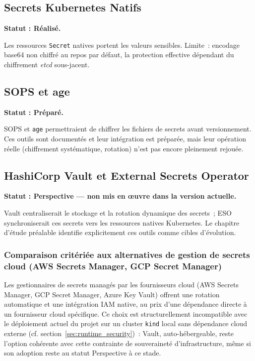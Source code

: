 \subsection{Secrets Kubernetes Natifs}
\textbf{Statut : Réalisé.}

Les ressources \texttt{Secret} natives portent les valeurs sensibles. Limite~: encodage base64 non chiffré au repos par défaut, la protection effective dépendant du chiffrement \textit{etcd} sous-jacent.

\subsection{SOPS et age}
\textbf{Statut : Préparé.}

SOPS et \texttt{age} permettraient de chiffrer les fichiers de secrets avant versionnement. Ces outils sont documentés et leur intégration est préparée, mais leur opération réelle (chiffrement systématique, rotation) n'est pas encore pleinement rejouée.

\subsection{HashiCorp Vault et External Secrets Operator}
\textbf{Statut : Perspective — non mis en œuvre dans la version actuelle.}

Vault centraliserait le stockage et la rotation dynamique des secrets~; ESO synchroniserait ces secrets vers les ressources natives Kubernetes. Le chapitre d'étude préalable identifie explicitement ces outils comme cibles d'évolution.

\subsubsection{Comparaison critériée aux alternatives de gestion de secrets cloud (AWS Secrets Manager, GCP Secret Manager)}
Les gestionnaires de secrets managés par les fournisseurs cloud (AWS Secrets Manager, GCP Secret Manager, Azure Key Vault) offrent une rotation automatique et une intégration IAM native, au prix d'une dépendance directe à un fournisseur cloud spécifique. Ce choix est structurellement incompatible avec le déploiement actuel du projet sur un cluster \texttt{kind} local sans dépendance cloud externe (cf. section~\ref{sec:runtime_security})~: Vault, auto-hébergeable, reste l'option cohérente avec cette contrainte de souveraineté d'infrastructure, même si son adoption reste au statut Perspective à ce stade.

